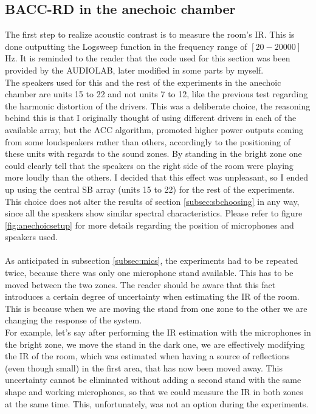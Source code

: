\subsection{BACC-RD in the anechoic chamber}{}
\label{subsec:baccrdanechoic}

The first step to realize acoustic contrast is to measure the room's IR. This is done outputting the Logsweep function in the frequency range of $[20-20000]$Hz. It is reminded to the reader that the code used for this section was been provided by the AUDIOLAB, later modified in some parts by myself.
\\
The speakers used for this and the rest of the experiments in the anechoic chamber are units 15 to 22 and not units 7 to 12, like the previous test regarding the harmonic distortion of the drivers. This was a deliberate choice, the reasoning behind this is that I originally thought of using different drivers in each of the available array, but the ACC algorithm, promoted higher power outputs coming from some loudspeakers rather than others, accordingly to the positioning of these units with regards to the sound zones. By standing in the bright zone one could clearly tell that the speakers on the right side of the room were playing more loudly than the others. I decided that this effect was unpleasant, so I ended up using the central SB array (units 15 to 22) for the rest of the experiments.
\\
This choice does not alter the results of section \ref{subsec:sbchoosing} in any way, since all the speakers show similar spectral characteristics.
Please refer to figure \ref{fig:anechoicsetup} for more details regarding the position of microphones and speakers used.
\\
\\
As anticipated in subsection \ref{subsec:mics}, the experiments had to be repeated twice, because there was only one microphone stand available. This has to be moved between the two zones. The reader should be aware that this fact introduces a certain degree of uncertainty when estimating the IR of the room. This is because when we are moving the stand from one zone to the other we are changing the response of the system.
\\
For example, let's say after performing the IR estimation with the microphones in the bright zone, we move the stand in the dark one, we are effectively modifying the IR of the room, which was estimated when having a source of reflections (even though small) in the first area, that has now been moved away. This uncertainty cannot be eliminated without adding a second stand with the same shape and working microphones, so that we could measure the IR in both zones at the same time. This, unfortunately, was not an option during the experiments.
